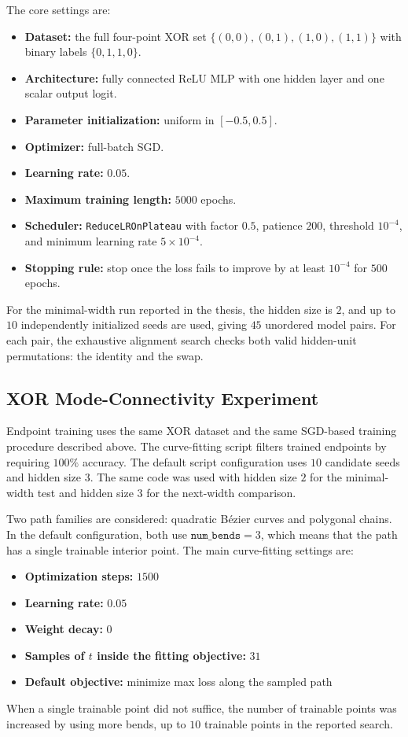 \documentclass[11pt,a4paper]{report}
\begin{document}
The core settings are:
\begin{itemize}
    \item \textbf{Dataset:} the full four-point XOR set \(\{(0,0),(0,1),(1,0),(1,1)\}\) with binary labels \(\{0,1,1,0\}\).
    \item \textbf{Architecture:} fully connected ReLU MLP with one hidden layer and one scalar output logit.
    \item \textbf{Parameter initialization:} uniform in \([-0.5,0.5]\).
    \item \textbf{Optimizer:} full-batch SGD.
    \item \textbf{Learning rate:} \(0.05\).
    \item \textbf{Maximum training length:} \(5000\) epochs.
    \item \textbf{Scheduler:} \texttt{ReduceLROnPlateau} with factor \(0.5\), patience \(200\), threshold \(10^{-4}\), and minimum learning rate \(5\times 10^{-4}\).
    \item \textbf{Stopping rule:} stop once the loss fails to improve by at least \(10^{-4}\) for \(500\) epochs.
\end{itemize}

For the minimal-width run reported in the thesis, the hidden size is \(2\), and up to \(10\) independently initialized seeds are used, giving \(45\) unordered model pairs. For each pair, the exhaustive alignment search checks both valid hidden-unit permutations: the identity and the swap.

\subsection{XOR Mode-Connectivity Experiment}

Endpoint training uses the same XOR dataset and the same SGD-based training procedure described above. The curve-fitting script filters trained endpoints by requiring \(100\%\) accuracy. The default script configuration uses \(10\) candidate seeds and hidden size \(3\). The same code was used with hidden size \(2\) for the minimal-width test and hidden size \(3\) for the next-width comparison.

Two path families are considered: quadratic Bézier curves and polygonal chains. In the default configuration, both use \(\texttt{num\_bends}=3\), which means that the path has a single trainable interior point. The main curve-fitting settings are:
\begin{itemize}
    \item \textbf{Optimization steps:} \(1500\)
    \item \textbf{Learning rate:} \(0.05\)
    \item \textbf{Weight decay:} \(0\)
    \item \textbf{Samples of \(t\) inside the fitting objective:} \(31\)
    \item \textbf{Default objective:} minimize max loss along the sampled path
\end{itemize}
When a single trainable point did not suffice, the number of trainable points was increased by using more bends, up to \(10\) trainable points in the reported search.
\end{document}
